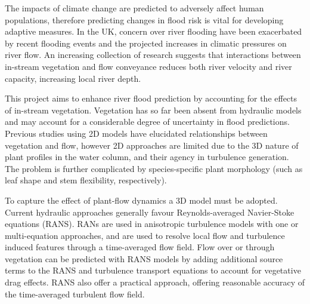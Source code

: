 \documentclass[11pt]{article}%
\begin{document}
\begin{minipage}[t]{.75\linewidth}

\vspace{1pt}
\begin{multicols}{2} %


The impacts of climate change are predicted to adversely affect human populations, therefore predicting changes in flood risk is vital for developing adaptive measures. In the UK, concern over river flooding have been exacerbated by recent flooding events and the projected increases in climatic pressures on river flow. An increasing collection of research suggests that interactions between in-stream vegetation and flow conveyance reduces both river velocity and river capacity, increasing local river depth. %




This project aims to enhance river flood prediction by accounting for the effects of in-stream vegetation. Vegetation has so far been absent from hydraulic models and may account for a considerable degree of uncertainty in flood predictions. Previous studies using 2D models have elucidated relationships between vegetation and flow, however 2D approaches are limited due to the 3D nature of plant profiles in the water column, and their agency in turbulence generation. The problem is further complicated by species-specific plant morphology (such as leaf shape and stem flexibility, respectively).%

To capture the effect of plant-flow dynamics a 3D model must be adopted. Current hydraulic approaches generally favour Reynolds-averaged Navier-Stoke equations (RANS). RANs are used in anisotropic turbulence models with one or multi-equation approaches, and are used to resolve local flow and turbulence induced features through a time-averaged flow field. Flow over or through vegetation can be predicted with RANS models by adding additional source terms to the RANS and turbulence transport equations to account for vegetative drag effects. RANS also offer a practical approach, offering reasonable accuracy of the time-averaged turbulent flow field.


\end{multicols}
\end{minipage}
\end{document}
